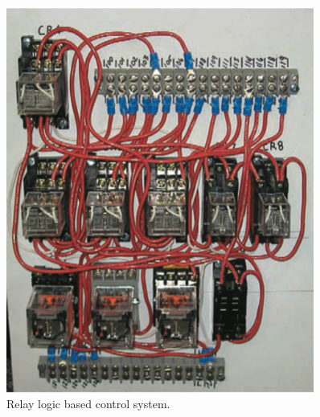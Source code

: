     \begin{figure}[H]
    \centering
    \begin{minipage}{0.35\textwidth}
        \centering
        \includegraphics[width = 0.9\textwidth]{2_images/relayLogic.png}
        \caption{Relay logic based control system.~\cite{petruzella2017programmable}}
        \label{fig:relayLogic}
    \end{minipage}\hfill
    \begin{minipage}{0.35\textwidth}
        \centering

\end{minipage}
\end{figure}
